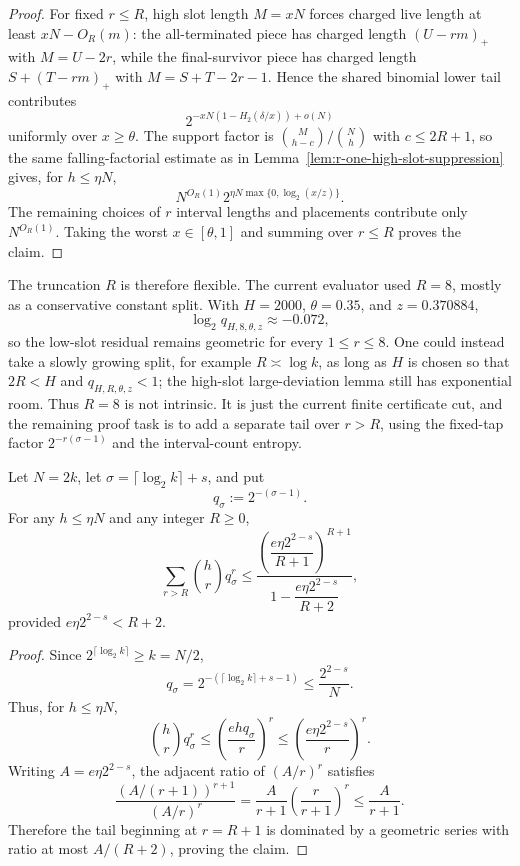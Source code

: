 \begin{proof}
For fixed \(r\le R\), high slot length \(M=xN\) forces charged live length at least \(xN-O_R(m)\): the all-terminated
piece has charged length \((U-rm)_+\) with \(M=U-2r\), while the final-survivor piece has charged length
\(S+(T-rm)_+\) with \(M=S+T-2r-1\).  Hence the shared binomial lower tail contributes
\[
2^{-xN(1-H_2(\delta/x))+o(N)}
\]
uniformly over \(x\ge\theta\).  The support factor is
\(\binom{M}{h-c}/\binom{N}{h}\) with \(c\le2R+1\), so the same falling-factorial estimate as in
Lemma~\ref{lem:r-one-high-slot-suppression} gives, for \(h\le\eta N\),
\[
N^{O_R(1)}2^{\eta N\max\{0,\log_2(x/z)\}}.
\]
The remaining choices of \(r\) interval lengths and placements contribute only \(N^{O_R(1)}\).  Taking the worst
\(x\in[\theta,1]\) and summing over \(r\le R\) proves the claim.
\end{proof}

The truncation \(R\) is therefore flexible.  The current evaluator used \(R=8\), mostly as a conservative constant
split.  With \(H=2000\), \(\theta=0.35\), and \(z=0.370884\),
\[
\log_2 q_{H,8,\theta,z}\approx -0.072,
\]
so the low-slot residual remains geometric for every \(1\le r\le8\).  One could instead take a slowly growing split,
for example \(R\asymp\log k\), as long as \(H\) is chosen so that \(2R<H\) and \(q_{H,R,\theta,z}<1\); the high-slot
large-deviation lemma still has exponential room.  Thus \(R=8\) is not intrinsic.  It is just the current finite
certificate cut, and the remaining proof task is to add a separate tail over \(r>R\), using the fixed-tap factor
\(2^{-r(\sigma-1)}\) and the interval-count entropy.

\begin{lemma}
\label{lem:large-r-fixedtap-candidate-tail}
Let \(N=2k\), let \(\sigma=\lceil\log_2 k\rceil+s\), and put
\[
q_\sigma:=2^{-(\sigma-1)}.
\]
For any \(h\le\eta N\) and any integer \(R\ge0\),
\[
\sum_{r>R}\binom{h}{r}q_\sigma^r
\le
\frac{
\left(\dfrac{e\eta 2^{2-s}}{R+1}\right)^{R+1}
}{
1-\dfrac{e\eta 2^{2-s}}{R+2}
},
\]
provided \(e\eta 2^{2-s}<R+2\).
\end{lemma}

\begin{proof}
Since \(2^{\lceil\log_2 k\rceil}\ge k=N/2\),
\[
q_\sigma
=
2^{-(\lceil\log_2 k\rceil+s-1)}
\le
\frac{2^{2-s}}{N}.
\]
Thus, for \(h\le\eta N\),
\[
\binom{h}{r}q_\sigma^r
\le
\left(\frac{ehq_\sigma}{r}\right)^r
\le
\left(\frac{e\eta2^{2-s}}{r}\right)^r.
\]
Writing \(A=e\eta2^{2-s}\), the adjacent ratio of \((A/r)^r\) satisfies
\[
\frac{(A/(r+1))^{r+1}}{(A/r)^r}
=
\frac{A}{r+1}\left(\frac{r}{r+1}\right)^r
\le
\frac{A}{r+1}.
\]
Therefore the tail beginning at \(r=R+1\) is dominated by a geometric series with ratio at most \(A/(R+2)\), proving
the claim.
\end{proof}

